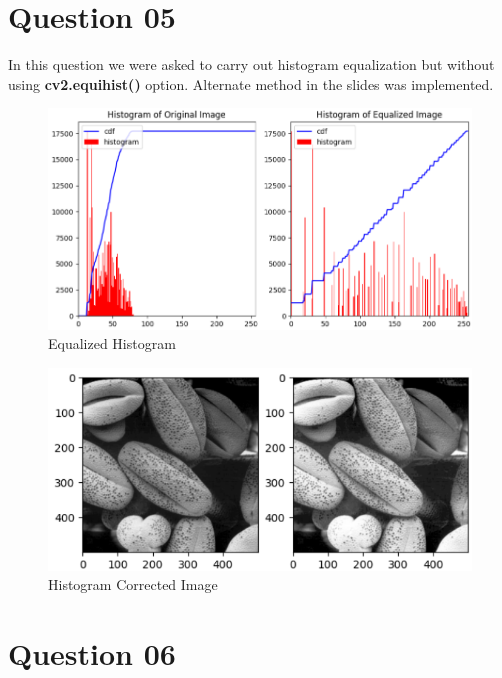 \documentclass[11pt,a4paper]{article}
\begin{document}
\newpage

\section{Question 05}

In this question we were asked to carry out histogram equalization but without using \textbf{cv2.equihist()} option. Alternate method in the slides was implemented.

\lstset{style=mystyle}


{\begin{figure}[h]
    \centering
    \includegraphics[width=1\linewidth]{images/5-1.png}
    \caption{Equalized Histogram}
\end{figure}}

\newpage

{\begin{figure}[h]
    \centering
    \includegraphics[width=1\linewidth]{images/5-2.png}
    \caption{Histogram Corrected Image}
\end{figure}}

\section{Question 06}
\end{document}
